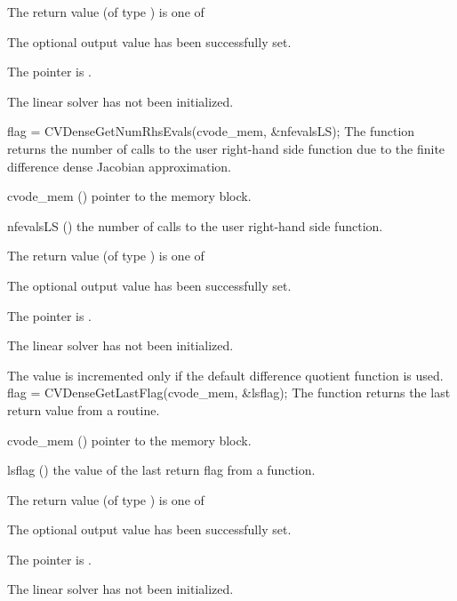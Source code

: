 {
  The return value  (of type ) is one of
  \begin{args}
  \item[\Id{CVDENSE\_SUCCESS}] 
    The optional output value has been successfully set.
  \item[\Id{CVDENSE\_MEM\_NULL}]
    The  pointer is .
  \item[\Id{CVDENSE\_LMEM\_NULL}]
    The {\cvdense} linear solver has not been initialized.
  \end{args}
}
{}
{
  flag = CVDenseGetNumRhsEvals(cvode\_mem, \&nfevalsLS);
}
{
  The function  returns the
  number of calls to the user right-hand side function due to the 
  finite difference dense Jacobian approximation.
}
{
  \begin{args}
  \item[cvode\_mem] ()
    pointer to the {\cvode} memory block.
  \item[nfevalsLS] ()
    the number of calls to the user right-hand side function.
  \end{args}
}
{
  The return value  (of type ) is one of
  \begin{args}
  \item[\Id{CVDENSE\_SUCCESS}] 
    The optional output value has been successfully set.
  \item[\Id{CVDENSE\_MEM\_NULL}]
    The  pointer is .
  \item[\Id{CVDENSE\_LMEM\_NULL}]
    The {\cvdense} linear solver has not been initialized.
  \end{args}
}
{
  The value  is incremented only if the default 
   difference quotient function is used.
}
{
  flag = CVDenseGetLastFlag(cvode\_mem, \&lsflag);
}
{
  The function  returns the
  last return value from a {\cvdense} routine. 
}
{
  \begin{args}
  \item[cvode\_mem] ()
    pointer to the {\cvode} memory block.
  \item[lsflag] ()
    the value of the last return flag from a {\cvdense} function.
  \end{args}
}
{
  The return value  (of type ) is one of
  \begin{args}
  \item[\Id{CVDENSE\_SUCCESS}] 
    The optional output value has been successfully set.
  \item[\Id{CVDENSE\_MEM\_NULL}]
    The  pointer is .
  \item[\Id{CVDENSE\_LMEM\_NULL}]
    The {\cvdense} linear solver has not been initialized.
  \end{args}
}
